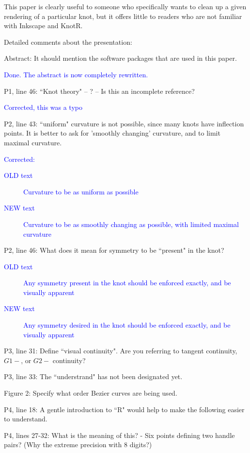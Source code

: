 \documentclass[12pt]{article}
\begin{document}
This paper is clearly useful to someone who specifically wants to
clean up a given rendering of a particular knot, but it offers little
to readers who are not familiar with Inkscape and KnotR.

Detailed comments about the presentation:

Abstract: It should mention the software packages that are used in
this paper.

\textcolor{blue}{Done.  The abstract is now completely rewritten.}

P1, line 46:  ``Knot theory" -- ?  -- Is this an incomplete reference?

\textcolor{blue}{Corrected, this was a typo}

P2, line 43: ``uniform" curvature is not possible, since many knots
have inflection points.  It is better to ask for 'smoothly changing'
curvature, and to limit maximal curvature.

\textcolor{blue}{Corrected:
  \begin{description}
  \item[OLD text] Curvature to be as uniform as possible
\item[NEW text] Curvature to be as smoothly changing as possible, with
  limited maximal curvature
  \end{description}
}
  


P2, line 46: What does it mean for symmetry to be ``present" in the
knot?

\textcolor{blue}{
  \begin{description}
  \item[OLD text] Any symmetry present in the knot should be enforced exactly, and be visually apparent
\item[NEW text] Any symmetry desired in the knot should be enforced exactly, and be visually apparent
  \end{description}
}


P3, line 31: Define ``visual continuity".  Are you referring to tangent
continuity, $G1-$, or $G2-$ continuity?

P3, line 33:  The ``understrand" has not been designated yet.

Figure 2:  Specify what order Bezier curves are being used.

P4, line 18: A gentle introduction to ``R" would help to make the
following easier to understand.

P4, lines 27-32: What is the meaning of this? - Six points defining
two handle pairs?  (Why the extreme precision with 8 digits?)
\end{document}
